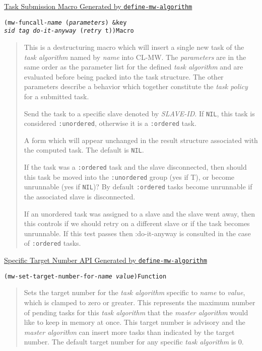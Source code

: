 \documentclass[titlepage,12pt]{book}
\newcommand{\phlabel}[1]{\phantomsection\label{#1}}
\newcommand{\xsmall}{\latexhtml{\small}{}}
\newcommand{\xnormalsize}{\latexhtml{\normalsize}{}}
\newcommand{\clmw}{\xsmall\textsc{CL-MW}\xnormalsize\xspace}
\newcommand{\ma}{\textit{master algorithm}\xspace}
\newcommand{\ta}{\textit{task algorithm}\xspace}
\newcommand{\tp}{\textit{task policy}\xspace}
\newcommand{\un}{\texttt{:unordered}\xspace}
\newcommand{\ord}{\texttt{:ordered}\xspace}
\newcommand{\macro}[1]{\mbox{\texttt{#1}}\xspace}
\newcommand{\bool}[1]{\texttt{#1}\xspace}
\newcommand{\apiheader}[1]{\begin{center}\underline{#1}\end{center}}
\newcommand{\apifunc}[2]{\noindent\xsmall\texttt{(#1)}\hspace*{\fill}\xnormalsize\texttt{#2}}
\newenvironment{apientry}[2]
	{\apifunc{#1}{#2}\begin{quotation}}
	{\end{quotation}}
\begin{document}
\apiheader{Task Submission Macro Generated by \macro{define-mw-algorithm}}
\begin{apientry}
{mw-funcall-\textit{name} (\emph{parameters}) \&key\\
\indent \emph{sid} \emph{tag} \emph{do-it-anyway} (\emph{retry} t)}
{Macro}
This is a destructuring macro which will insert a single new task
of the \ta named by \emph{name}  into \clmw. The \emph{parameters}
are in the same order as the parameter list for the defined \ta and
are evaluated before being packed into the task structure. The other
parameters describe a behavior which together constitute the \tp for
a submitted task.

\begin{description}
\phlabel{task-policy}
\item[sid \textit{SLAVE-ID}] Send the task to a specific slave denoted by 
					\textit{SLAVE-ID}.
                    If \bool{NIL}, this task is considered \un, otherwise it is 
					a \ord task. 
\item[tag \textit{FORM}] A form which will appear unchanged in the result
			structure associated with the computed task. The default is 
			\bool{NIL}.
\item[do-it-anyway {[T \textit{or} NIL]}] If the task was a 
							\ord task and the slave disconnected, then should
							this task be moved into the \un group (yes if T),
							or become unrunnable (yes if \bool{NIL})? 
							By default \ord tasks become unrunnable if the 
							associated slave is disconnected. 
\item[retry {[T \textit{or} NIL]}] If an unordered task was assigned to a 
			slave and the slave went away, then this controls if we should
			retry on a different slave or if the task becomes unrunnable. If
			this test passes then :do-it-anyway is consulted in the case of
			\ord tasks. 
\end{description}
\end{apientry}

\apiheader{Specific Target Number API Generated by \macro{define-mw-algorithm}}

\begin{apientry}
{mw-set-target-number-for-\textit{name} \emph{value}}
{Function}
Sets the target number for the \ta specific to \emph{name} to
\emph{value}, which is clamped to zero or greater.  This represents
the maximum number of pending tasks for this \ta that
the \ma would like to keep in memory at once. This target number is advisory
and the \ma can insert more tasks than indicated by the target number. The
default target number for any specific \ta is 0.  
\end{apientry}
\end{document}
